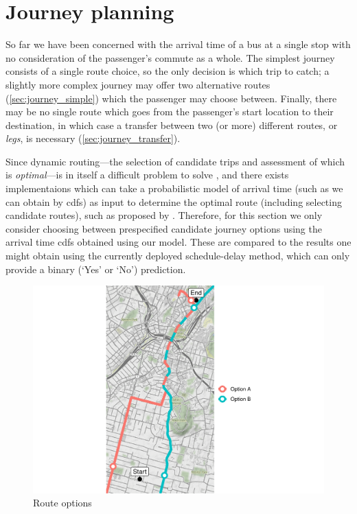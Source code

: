 \section{Journey planning}
\label{sec:etas-journey-planning}

So far we have been concerned with the arrival time of a bus at a single stop with no consideration of the passenger's commute as a whole. The simplest journey consists of a single route choice, so the only decision is which trip to catch; a slightly more complex journey may offer two alternative routes (\cref{sec:journey_simple}) which the passenger may choose between. Finally, there may be no single route which goes from the passenger's start location to their destination, in which case a transfer between two (or more) different routes, or \emph{legs}, is necessary (\cref{sec:journey_transfer}).


Since dynamic routing---the selection of candidate trips and \rt{} assessment of which is \emph{optimal}---is in itself a difficult problem to solve \citep{Hame_2013a,Hame_2013b,Zheng_2016}, and there exists implementaions which can take a probabilistic model of arrival time (such as we can obtain by \glspl{cdf}) as input to determine the optimal route (including selecting candidate routes), such as proposed by \citet{Berczi_2017}. Therefore, for this section we only consider choosing between prespecified candidate journey options using the arrival time \glspl{cdf} obtained using our \pf{} model. These are compared to the results one might obtain using the currently deployed schedule-delay method, which can only provide a binary (`Yes' or `No') prediction.


\begin{knitrout}\small
{}\color{fgcolor}\begin{figure}

{\centering \includegraphics[width=\textwidth]{figure/eta_journey_arrival_prep-1} 

}

\caption[Route options]{Route options}\label{fig:eta_journey_arrival_prep}
\end{figure}


\end{knitrout}

